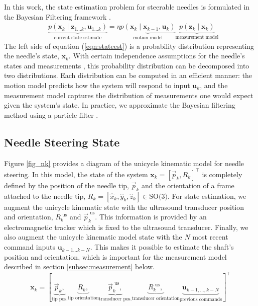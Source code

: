 \documentclass[journal,transmag]{IEEEtran}
\newcommand{\bvar}[2]{\mathbf{#1}_{#2}}
\newcommand{\stateest}[1][k]{p(\mathbf{x}_{#1} \mid \mathbf{z}_{1...#1},\mathbf{u}_{1...#1})}
\newcommand{\meas}[1][k]{p(\mathbf{z}_{#1} \mid \mathbf{x}_{#1})}
\newcommand{\motion}[1][k]{p(\mathbf{x}_{#1} \mid \mathbf{x}_{#1-1},\mathbf{u}_{#1})}
\newcommand{\usorientation}[1][k]{R^{\text{ us}}_{#1}}
\newcommand{\uspos}[1][k]{\vec{p}^{\text{ us}}_{#1}}
\begin{document}
In this work, the state estimation problem for steerable needles is formulated in the Bayesian Filtering framework \cite{Thrun:2005}.
\begin{align}  \label{eqn:stateest}
&\underbrace{\stateest}_{\text{current state estimate}} = \eta \underbrace{\motion}_{\text{motion model}} \underbrace{\meas}_{\text{measurement model}}
\end{align}
The left side of equation (\ref{eqn:stateest}) is a probability distribution representing the needle's state, $\bvar{x}{k}$.  With certain independence assumptions for the needle's states and measurements \cite{Thrun:2005}, this probability distribution can be decomposed into two distributions. Each distribution can be computed in an efficient manner:  the motion model predicts how the system will respond to input $\bvar{u}{k}$, and the measurement model captures the distribution of measurements one would expect given the system's state.   In practice, we approximate the Bayesian filtering method using a particle filter \cite{Gordon1993}.


\subsection{Needle Steering State} \label{subsec:state}
Figure \ref{fig_nk} provides a diagram of the unicycle kinematic model for needle steering.  In this model, the state of the system $\bvar{x}{k} =  \left[\vec{p}_k, R_k\right]^\top$ is completely defined by the position of the needle tip, $\vec{p}_k$ and the orientation of a frame attached to the needle tip, $R_k = \left[\hat{x}_k,\hat{y}_k,\hat{z}_k\right] \in \text{SO(3)}$.  For state estimation, we augment the unicycle kinematic state with the ultrasound transducer position and orientation, $\usorientation$ and $\uspos$.  This information is provided by an electromagnetic tracker which is fixed to the ultrasound transducer.  Finally,  we also augment the unicycle kinematic model state with the $N$ most recent command inputs $\bvar{u}{k-1...k-N}$.  This makes it possible to estimate the shaft's position and orientation, which is important for the measurement model described in section \ref{subsec:measurement} below.
\begin{dmath*}
\bvar{x}{k} =  \left[\underbrace{\vec{p}_k,}_{\text{tip pos.}} \underbrace{R_k,}_{\text{tip orientation}} \underbrace{\uspos,}_{\text{transducer pos.}} \underbrace{\usorientation,}_{\text{transducer orientation}} \underbrace{\bvar{u}{k-1,...,k-N}}_{\text{previous commands}}\right]^\top
\end{dmath*}
\end{document}
